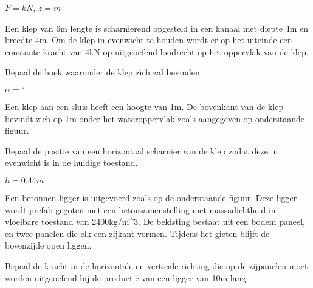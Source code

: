 	\begin{antwoord}
		$F = \unit{}{kN}$, $z=\unit{}{m}$ 
	\end{antwoord}
	\begin{toepassing}
		\label{sluisklephoek}
Een klep van 6m lengte is scharnierend opgesteld in een kanaal met diepte 4m en breedte 4m. Om de klep in evenwicht te houden wordt er op het uiteinde een constante kracht van \unit{4}{kN} op uitgeoefend loodrecht op het oppervlak van de klep.
		
Bepaal de hoek waaronder de klep zich zal bevinden.
		\begin{center}
		\end{center}
	\end{toepassing}
	\begin{antwoord}
		$\alpha = \unit{}{^\circ}$ 
	\end{antwoord}	
	\begin{toepassing*}
		\label{sluisklep}
Een klep aan een sluis heeft een hoogte van \unit{1}{m}. De bovenkant van de klep bevindt zich op 1m onder het wateroppervlak zoals aangegeven op onderstaande figuur.
		
Bepaal de positie van een horizontaal scharnier van de klep zodat deze in evenwicht is in de huidige toestand.
		\begin{center}
			
		\end{center}
	\end{toepassing*}
	\begin{antwoord}
		$h = \unit{0.44}{m}$
	\end{antwoord}
	\begin{toepassing*}
		\label{betonnenligger}
Een betonnen ligger is uitgevoerd zoals op de onderstaande figuur. Deze ligger wordt prefab gegoten met een betonsamenstelling met massadichtheid in vloeibare toestand van \unit{2400}{kg/m^3}. De bekisting bestaat uit een bodem paneel, en twee panelen die elk een zijkant vormen. Tijdens het gieten blijft de bovenzijde open liggen.
		
Bepaal de kracht in de horizontale en verticale richting die op de zijpanelen moet worden uitgeoefend bij de productie van een ligger van \unit{10}{m} lang.
		\begin{center}
			
		\end{center}
	\end{toepassing*}
